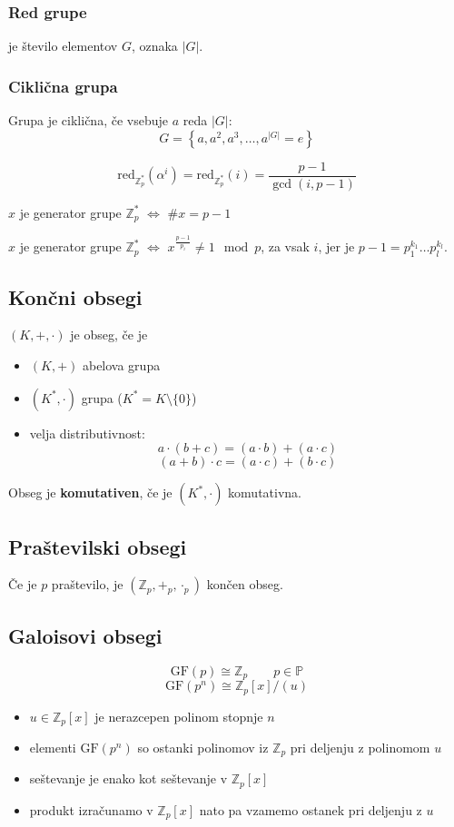 \begin{multicols}{5}
\subsubsection{Red grupe}
je število elementov $G$, oznaka $|G|$.

\subsubsection*{Ciklična grupa}
Grupa je ciklična, če vsebuje $a$ reda $|G|$:
\[ G = \left\{ a, a^2, a^3, \dots, a^{|G|} = e\right\}\]


\[ \text{red}_{\mathbb{Z}_p^*}(\alpha^i) = \text{red}_{\mathbb{Z}_p^*}(i) = \frac{p-1}{\gcd(i, p-1)}\]

$x$ je generator grupe $\mathbb{Z}^*_p$ $\iff$ $\# x = p - 1$

$x$ je generator grupe $\mathbb{Z}^*_p$ $\iff$ $x^{\frac{p-1}{p_i}} \neq 1 \mod p$, za vsak $i$, jer je $p-1 = p_1^{k_1} \dots p_l^{k_l}$.

\subsection*{Končni obsegi}
$(K, +,\cdot)$ je obseg, če je
\begin{itemize}
	\item $(K, +)$ abelova grupa
	\item $(K^*, \cdot)$ grupa ($K^* = K \setminus \{0\}$)
	\item velja distributivnost:
	\[ a \cdot (b+c) = (a\cdot b) + (a \cdot c)\]
	\[ (a+b) \cdot c = (a\cdot c) + (b \cdot c)\]
\end{itemize}

Obseg je \textbf{komutativen}, če je $(K^*, \cdot)$ komutativna.

\subsection*{Praštevilski obsegi}
Če je $p$ praštevilo, je $(\mathbb{Z}_p, +_p, \cdot_p)$ končen obseg.


\subsection*{Galoisovi obsegi}
\[\text{GF}(p) \cong \mathbb{Z}_p \qquad p \in \mathbb{P}\]
\[ \text{GF}(p^n) \cong \mathbb{Z}_p[x]/(u) \]
\begin{itemize}
	\item $u \in \mathbb{Z}_p[x]$ je nerazcepen polinom stopnje $n$
	\item elementi $\text{GF}(p^n)$ so ostanki polinomov iz $\mathbb{Z}_p$ pri deljenju z polinomom $u$
	\item seštevanje je enako kot seštevanje v $\mathbb{Z}_p[x]$
	\item produkt izračunamo v $\mathbb{Z}_p[x]$ nato pa vzamemo ostanek pri deljenju z $u$
\end{itemize}


\end{multicols}
